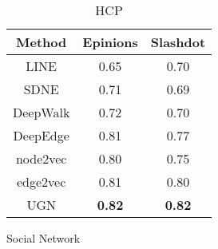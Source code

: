 \begin{table*}[htbp]
\begin{subtable}{.3\linewidth}
{\begin{tabular}{c|c|c|}
        \multicolumn{1}{|c|}{Method} & Epinions & Slashdot \\
        \hline
        \multicolumn{1}{|c|}{LINE \cite{tang2015line}}  & 0.65 & 0.70 \\
        \multicolumn{1}{|c|}{SDNE \cite{wang2016structural}} & 0.71 & 0.69 \\
        \multicolumn{1}{|c|}{DeepWalk \cite{perozzi2014deepwalk}} & 0.72 & 0.70\\
        \multicolumn{1}{|c|}{DeepEdge \cite{abu2017learning}} & 0.81 & 0.77\\ 
        \multicolumn{1}{|c|}{node2vec \cite{grover2016node2vec}}  & 0.80 & 0.75\\
        \multicolumn{1}{|c|}{edge2vec \cite{wang2020edge2vec}} & 0.81 & 0.80\\
        \multicolumn{1}{|c|}{UGN} & \textbf{0.82} & \textbf{0.82} \\
        \hline
        \end{tabular}}
        \caption{Social Network}
        \label{tab:SocNet_compare}
    \end{subtable}
    \begin{subtable}{.4\linewidth}
      \centering
        \caption{HCP}
        \label{tab:HCP_compare}

\end{subtable}
\end{table*}
